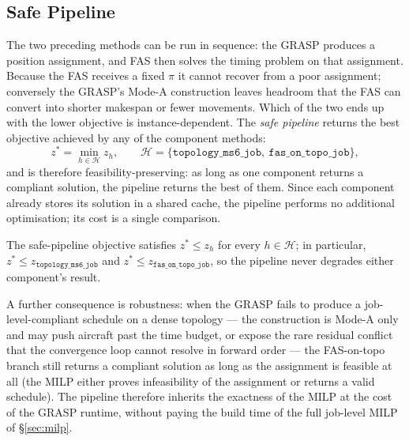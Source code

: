 \subsection{Safe Pipeline}
\label{sec:safe_pipeline}

The two preceding methods can be run in sequence: the GRASP produces a
position assignment, and FAS then solves the timing problem on that
assignment.  Because the FAS receives a fixed $\pi$ it cannot recover
from a poor assignment; conversely the GRASP's Mode-A construction
leaves headroom that the FAS can convert into shorter makespan or fewer
movements.  Which of the two ends up with the lower objective is
instance-dependent.  The \emph{safe pipeline} returns the best
objective achieved by any of the component methods:
\[
  z^* = \min_{h \in \mathcal{H}} z_h,
  \qquad \mathcal{H} = \{\texttt{topology\_ms6\_job},\ \texttt{fas\_on\_topo\_job}\},
\]
and is therefore feasibility-preserving: as long as one component
returns a compliant solution, the pipeline returns the best of them.
Since each component already stores its solution in a shared cache,
the pipeline performs no additional optimisation; its cost is a
single comparison.

\begin{proposition}
The safe-pipeline objective satisfies $z^* \le z_h$ for every
$h \in \mathcal{H}$; in particular, $z^* \le z_{\texttt{topology\_ms6\_job}}$
and $z^* \le z_{\texttt{fas\_on\_topo\_job}}$, so the pipeline never
degrades either component's result.
\end{proposition}

A further consequence is robustness: when the GRASP fails to produce a
job-level-compliant schedule on a dense topology --- the construction
is Mode-A only and may push aircraft past the time budget, or expose
the rare residual conflict that the convergence loop cannot resolve in
forward order --- the FAS-on-topo branch still returns a compliant
solution as long as the assignment is feasible at all (the MILP either
proves infeasibility of the assignment or returns a valid schedule).
The pipeline therefore inherits the exactness of the MILP at the cost
of the GRASP runtime, without paying the build time of the full
job-level MILP of \S\ref{sec:milp}.
